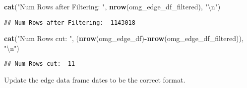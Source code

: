 \documentclass[]{article}
\newenvironment{Shaded}{\begin{snugshade}}{\end{snugshade}}
\newcommand{\KeywordTok}[1]{\textcolor[rgb]{0.13,0.29,0.53}{\textbf{#1}}}
\newcommand{\CharTok}[1]{\textcolor[rgb]{0.31,0.60,0.02}{#1}}
\newcommand{\StringTok}[1]{\textcolor[rgb]{0.31,0.60,0.02}{#1}}
\newcommand{\OperatorTok}[1]{\textcolor[rgb]{0.81,0.36,0.00}{\textbf{#1}}}
\newcommand{\NormalTok}[1]{#1}
\begin{document}
\begin{Shaded}
\begin{Highlighting}[]
\KeywordTok{cat}\NormalTok{(}\StringTok{"Num Rows after Filtering: "}\NormalTok{, }\KeywordTok{nrow}\NormalTok{(omg_edge_df_filtered), }\StringTok{"}\CharTok{\textbackslash{}n}\StringTok{"}\NormalTok{)}
\end{Highlighting}
\end{Shaded}

\begin{verbatim}
## Num Rows after Filtering:  1143018
\end{verbatim}

\begin{Shaded}
\begin{Highlighting}[]
\KeywordTok{cat}\NormalTok{(}\StringTok{"Num Rows cut: "}\NormalTok{, (}\KeywordTok{nrow}\NormalTok{(omg_edge_df)}\OperatorTok{-}\KeywordTok{nrow}\NormalTok{(omg_edge_df_filtered)), }\StringTok{"}\CharTok{\textbackslash{}n}\StringTok{"}\NormalTok{)}
\end{Highlighting}
\end{Shaded}

\begin{verbatim}
## Num Rows cut:  11
\end{verbatim}

\begin{Shaded}
\end{Shaded}

Update the edge data frame dates to be the correct format.

\begin{Shaded}
\end{Shaded}
\end{document}
